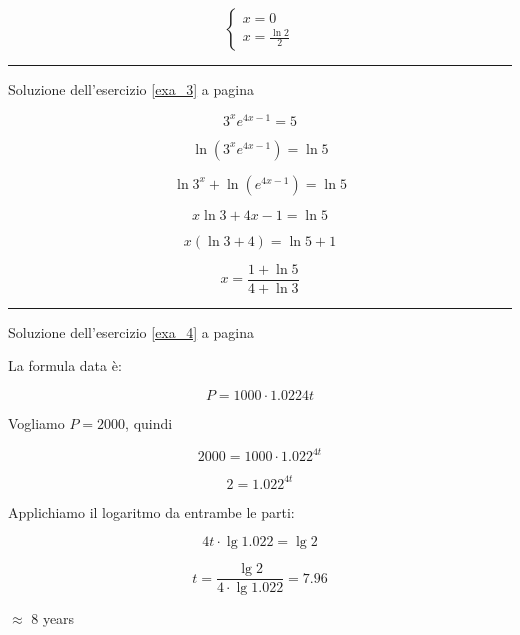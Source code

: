 \begin{equation*}
\left\{
\begin{array}{ll}
x=0 \\
x=\frac{\ln2}{2}
\end{array}
\right.
\end{equation*}



\vspace{1cm}
\hrule
\vspace{1cm}

Soluzione dell'esercizio \ref{exa_3} a pagina \pageref{exa_3}\label{sola_3}


\begin{equation*}
3^xe^{4x-1} = 5
\end{equation*}

\begin{equation*}
\ln ( 3^xe^{4x - 1} ) = \ln 5
\end{equation*}

\begin{equation*}
\ln 3^x + \ln ( e^{4x - 1} ) = \ln 5
\end{equation*}

\begin{equation*}
x\ln 3+4x-1=\ln 5
\end{equation*}

\begin{equation*}
x(\ln3 +4)=\ln 5 +1
\end{equation*}

\begin{equation*}
x=\frac{
1+\ln 5
}{
4+\ln 3
}
\end{equation*}

\vspace{1cm}
\hrule
\vspace{1cm}

\begin{minipage}{\textwidth}
Soluzione dell'esercizio \ref{exa_4} a pagina \pageref{exa_4}\label{sola_4}

La formula data è: 

\begin{equation*}
P = 1000 \cdot 1.0224t
\end{equation*}

Vogliamo $P=2000$, quindi 

\begin{equation*}
2000 = 1000 \cdot 1.022^{4t}
\end{equation*}

\begin{equation*}
2= 1.022^{4t}
\end{equation*}

Applichiamo il logaritmo da entrambe le parti:

\begin{equation*}
4t\cdot \lg 1.022 = \lg 2
\end{equation*}


\begin{equation*}
t=\frac{
\lg 2
}{
4\cdot\lg 1.022
} = 7.96
\end{equation*}

$\approx$ 8 years

\end{minipage}

